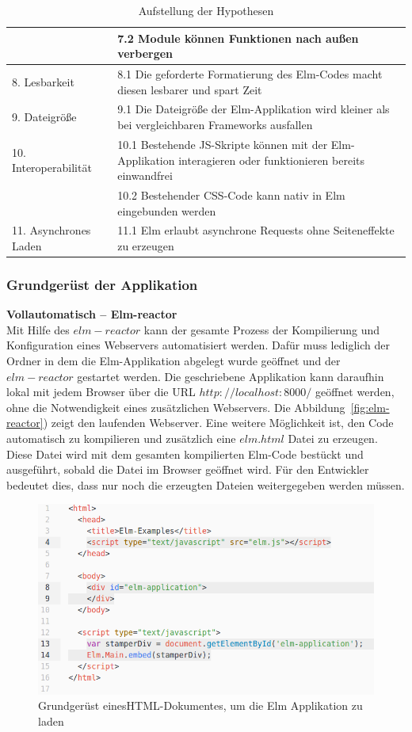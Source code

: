 \begin{table}[p]
\begin{tabular}{ | l | p{7.6cm} | }
	& 7.2 Module können Funktionen nach außen verbergen\\
	\hline
	8. Lesbarkeit &  8.1 Die geforderte Formatierung des Elm-Codes macht diesen lesbarer und spart Zeit\\	
	\hline
	9. Dateigröße &  9.1 Die Dateigröße der Elm-Applikation wird kleiner als bei vergleichbaren Frameworks ausfallen\\
	\hline
	10. Interoperabilität &  10.1 Bestehende \ac{JS}-Skripte können mit der Elm-Applikation interagieren oder funktionieren bereits einwandfrei\\
	& 10.2 Bestehender \ac{CSS}-Code kann nativ in Elm eingebunden werden\\
	\hline
	11. Asynchrones Laden &  11.1 Elm erlaubt asynchrone Requests ohne Seiteneffekte zu erzeugen\\
	\hline
\end{tabular}
\caption{Aufstellung der Hypothesen}\label{tab:Hypothesentabelle}
\end{table}


\subsubsection{Grundgerüst der Applikation}
\label{sec:Grundaufbau}

\textbf{Vollautomatisch – Elm-reactor}\\
Mit Hilfe des $elm-reactor$ kann der gesamte Prozess der Kompilierung und Konfiguration eines Webservers automatisiert werden. Dafür muss lediglich der Ordner in dem die Elm-Applikation abgelegt wurde geöffnet und der $elm-reactor$ gestartet werden. Die geschriebene Applikation kann daraufhin lokal mit jedem Browser über die URL $http://localhost:8000/$ geöffnet werden, ohne die Notwendigkeit eines zusätzlichen Webservers. Die Abbildung~\ref{fig:elm-reactor}) zeigt den laufenden Webserver.
Eine weitere Möglichkeit ist, den Code automatisch zu kompilieren und zusätzlich eine $elm.html$ Datei zu erzeugen. Diese Datei wird mit dem gesamten kompilierten Elm-Code bestückt und ausgeführt, sobald die Datei im Browser geöffnet wird. Für den Entwickler bedeutet dies, dass nur noch die erzeugten Dateien weitergegeben werden müssen.
\begin{figure}[hb]
\centering
\includegraphics[scale=0.4]{img/elm-make_include_in_index.png}
\caption{Grundgerüst eines\ac{HTML}-Dokumentes, um die Elm Applikation zu laden}\label{fig:html-boilerplate}
\end{figure}

